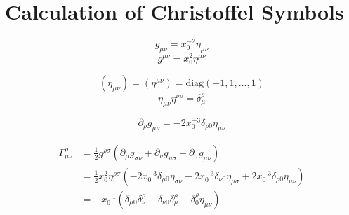 \chapter{Calculation of Christoffel Symbols}

$$g_{\mu\nu} = x_0^{-2} \eta_{\mu\nu}$$
$$g^{\mu\nu} = x_0^2    \eta^{\mu\nu}$$

$$(\eta_{\mu\nu}) = (\eta^{\mu\nu}) = \mathrm{diag}(-1,1,\ldots,1)$$
$$\eta_{\mu\nu} \eta^{\nu\rho} = \delta_\mu^\rho$$

$$\partial_\rho g_{\mu\nu} = -2 x_0^{-3} \delta_{\rho 0} \eta_{\mu\nu}$$

\begin{equation*}
\begin{split}
\Gamma_{\mu\nu}^\rho &= \frac12 g^{\rho\sigma} (\partial_\mu g_{\sigma\nu} + \partial_\nu g_{\mu\sigma} - \partial_\sigma g_{\mu\nu}) \\
&= \frac12 x_0^2 \eta^{\rho\sigma} ( - 2 x_0^{-3} \delta_{\mu 0} \eta_{\sigma\nu} - 2 x_0^{-3} \delta_{\nu 0} \eta_{\mu\sigma} + 2 x_0^{-3} \delta_{\rho 0} \eta_{\mu\nu}) \\
&= - x_0^{-1} (\delta_{\mu 0} \delta_\nu^\rho + \delta_{\nu 0} \delta_\mu^\rho - \delta_0^\rho \eta_{\mu\nu})
\end{split}
\end{equation*}